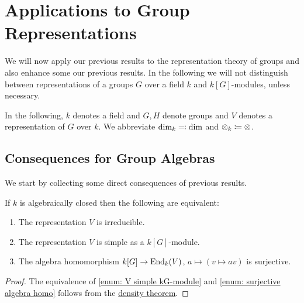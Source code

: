 \section{Applications to Group Representations}


\begin{fluff}
  We will now apply our previous results to the representation theory of groups and also enhance some our previous results.
  In the following we will not distinguish between representations of a groups $G$ over a field $k$ and $k[G]$-modules, unless necessary.
\end{fluff}


\begin{conventions}
  In the following, $k$ denotes a field and $G, H$ denote groups and $V$ denotes a representation of $G$ over $k$.
  We abbreviate $\dim_k \eqqcolon \dim$ and $\mathbin{\otimes}_k \coloneqq \mathbin{\otimes}$.
\end{conventions}





\subsection{Consequences for Group Algebras}


\begin{fluff}
  We start by collecting some direct consequences of previous results.
\end{fluff}


\begin{lemma}
  \label{lemma: equivalence to irreducible}
  If $k$ is algebraically closed then the following are equivalent:
  \begin{enumerate}
    \item \label{enum: V irreducible}
      The representation $V$ is irreducible.
    \item \label{enum: V simple kG-module}
      The representation $V$ is simple as a $k[G]$-module.
    \item \label{enum: surjective algebra homo}
      The algebra homomorphism $k[G] \to \operatorname{End}_k(V)$, $a \mapsto (v \mapsto av)$ is surjective.
  \end{enumerate}
\end{lemma}
\begin{proof}
  The equivalence of \ref*{enum: V simple kG-module} and \ref*{enum: surjective algebra homo} follows from the \hyperref[theorem: density theorem]{density theorem}.
\end{proof}


